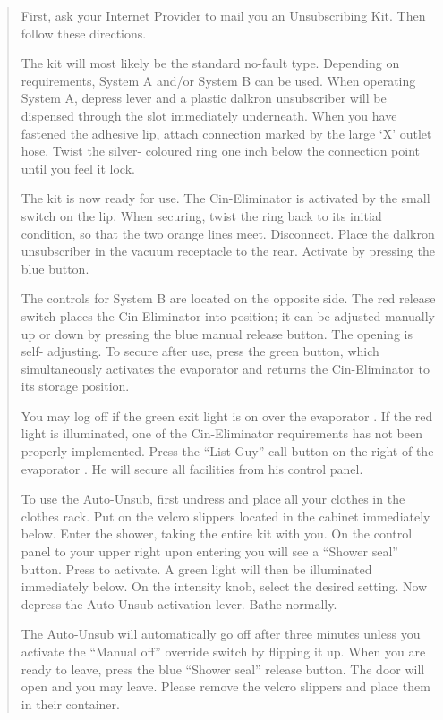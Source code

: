 \documentclass[a4paper]{report}
\begin{document}
\begin{appendix}
\begin{quotation}
First, ask your Internet Provider to mail you an Unsubscribing Kit.
Then follow these directions.

The kit will most likely be the standard no-fault type. Depending on
requirements, System A and/or System B can be used. When operating
System A, depress lever and a plastic dalkron unsubscriber will be
dispensed through the slot immediately underneath. When you have
fastened the adhesive lip, attach connection marked by the large `X'
outlet hose. Twist the silver- coloured ring one inch below the
connection point until you feel it lock.

The kit is now ready for use. The Cin-Eliminator is activated by the
small switch on the lip. When securing, twist the ring back to its
initial condition, so that the two orange lines meet. Disconnect.
Place the dalkron unsubscriber in the vacuum receptacle to the rear.
Activate by pressing the blue button.

The controls for System B are located on the opposite side. The red
release switch places the Cin-Eliminator into position; it can be
adjusted manually up or down by pressing the blue manual release
button. The opening is self- adjusting. To secure after use, press the
green button, which simultaneously activates the evaporator and
returns the Cin-Eliminator to its storage position.

You may log off if the green exit light is on over the evaporator . If
the red light is illuminated, one of the Cin-Eliminator requirements
has not been properly implemented. Press the ``List Guy'' call button on
the right of the evaporator . He will secure all facilities from his
control panel.

To use the Auto-Unsub, first undress and place all your clothes in the
clothes rack. Put on the velcro slippers located in the cabinet
immediately below. Enter the shower, taking the entire kit with you.
On the control panel to your upper right upon entering you will see a
``Shower seal'' button. Press to activate. A green light will then be
illuminated immediately below. On the intensity knob, select the
desired setting. Now depress the Auto-Unsub activation lever. Bathe
normally.

The Auto-Unsub will automatically go off after three minutes unless
you activate the ``Manual off'' override switch by flipping it up. When
you are ready to leave, press the blue ``Shower seal'' release button.
The door will open and you may leave. Please remove the velcro
slippers and place them in their container.


\end{quotation}
\end{appendix}
\end{document}
